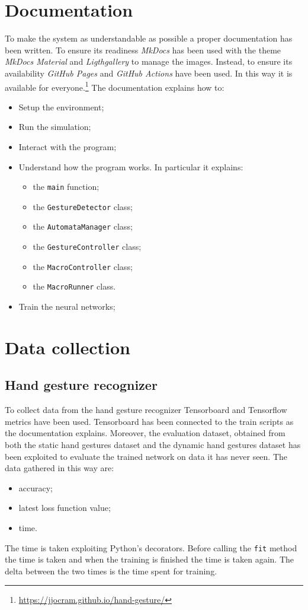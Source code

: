 \documentclass[../thesis.tex]{subfiles}
\begin{document}
\section{Documentation}
To make the system as understandable as possible a proper documentation has been written. To ensure its readiness \textit{MkDocs} has been used with the theme \textit{MkDocs Material} and \textit{Ligthgallery} to manage the images. Instead, to ensure its availability \textit{GitHub Pages} and \textit{GitHub Actions} have been used. In this way it is available for everyone.\footnote{\href{https://jjocram.github.io/hand-gesture/}{https://jjocram.github.io/hand-gesture/}} The documentation explains how to:
\begin{itemize}
    \item Setup the environment;
    \item Run the simulation;
    \item Interact with the program;
    \item Understand how the program works. In particular it explains:
    \begin{itemize}
        \item the \texttt{main} function;
        \item the \texttt{GestureDetector} class;
        \item the \texttt{AutomataManager} class;
        \item the \texttt{GestureController} class;
        \item the \texttt{MacroController} class;
        \item the \texttt{MacroRunner} class.
    \end{itemize}
    \item Train the neural networks;
\end{itemize}

\section{Data collection}
\subsection{Hand gesture recognizer}
To collect data from the hand gesture recognizer Tensorboard and Tensorflow metrics have been used. Tensorboard has been connected to the train scripts as the documentation explains. Moreover, the evaluation dataset, obtained from both the static hand gestures dataset and the dynamic hand gestures dataset has been exploited to evaluate the trained network on data it has never seen. The data gathered in this way are:
\begin{itemize}
    \item accuracy;
    \item latest loss function value;
    \item time.
\end{itemize}
The time is taken exploiting Python's decorators. Before calling the \texttt{fit} method the time is taken and when the training is finished the time is taken again. The delta between the two times is the time spent for training.
\end{document}
